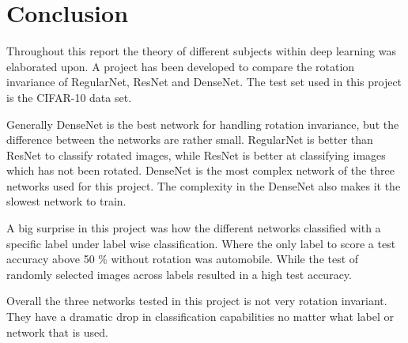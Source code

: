 \chapter{Conclusion}
\label{chp:conc}

Throughout this report the theory of different subjects within deep learning was elaborated upon. A project has been developed to compare the rotation invariance of RegularNet, ResNet and DenseNet. The test set used in this project is the CIFAR-10 data set.

Generally DenseNet is the best network for handling rotation invariance, but the difference between the networks are rather small. RegularNet is better than ResNet to classify rotated images, while ResNet is better at classifying images which has not been rotated. DenseNet is the most complex network of the three networks used for this project. The complexity in the DenseNet also makes it the slowest network to train.
\newline

A big surprise in this project was how the different networks classified with a specific label under label wise classification. Where the only label to score a test accuracy above 50 \% without rotation was automobile. While the test of randomly selected images across labels resulted in a high test accuracy.

Overall the three networks tested in this project is not very rotation invariant. They have a dramatic drop in classification capabilities no matter what label or network that is used.